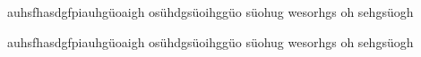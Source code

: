 
{
auhsfhasdgfpiauhgüoaigh osühdgsüoihggüo süohug wesorhgs oh sehgsüogh
}

{
auhsfhasdgfpiauhgüoaigh osühdgsüoihggüo süohug wesorhgs oh sehgsüogh
}
